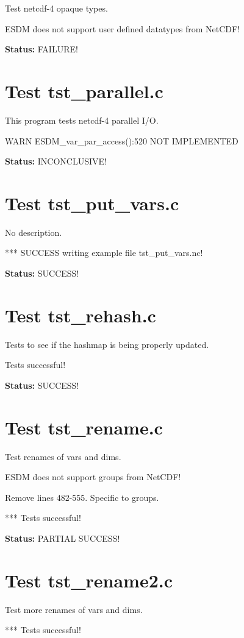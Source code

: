 Test netcdf-4 opaque types.

ESDM does not support user defined datatypes from NetCDF!

{\bf \large Status: } FAILURE!

\section{Test tst\_parallel.c}

This program tests netcdf-4 parallel I/O.

WARN ESDM\_var\_par\_access():520 NOT IMPLEMENTED

{\bf \large Status: } INCONCLUSIVE!

\section{Test tst\_put\_vars.c}

No description.

*** SUCCESS writing example file tst\_put\_vars.nc!

{\bf \large Status: } SUCCESS!

\section{Test tst\_rehash.c}

Tests to see if the hashmap is being properly updated.

Tests successful!

{\bf \large Status: } SUCCESS!

\section{Test tst\_rename.c}

Test renames of vars and dims.

ESDM does not support groups from NetCDF!

Remove lines 482-555. Specific to groups.

*** Tests successful!

{\bf \large Status: } PARTIAL SUCCESS!

\section{Test tst\_rename2.c}

Test more renames of vars and dims.

*** Tests successful!

